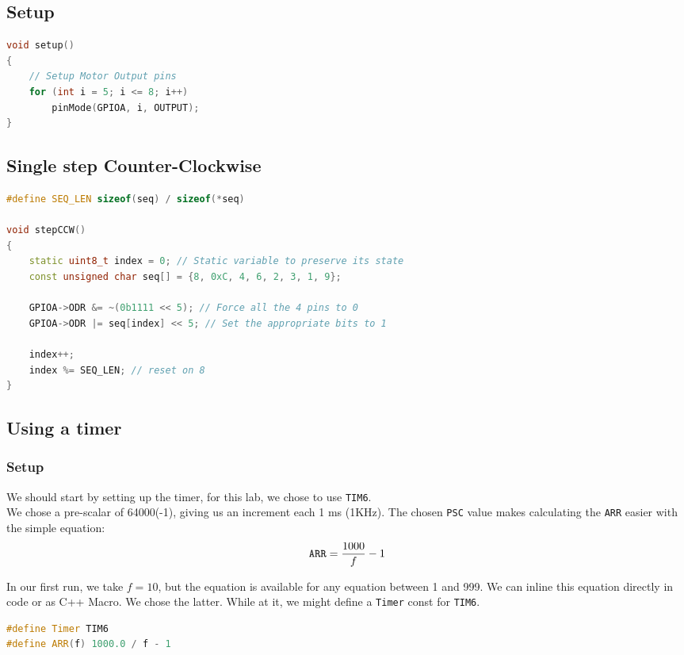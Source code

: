 \documentclass{article}
\begin{document}
\subsection{Setup}

\begin{lstlisting}[language=C++, caption={Motor output setup}]
void setup()
{
    // Setup Motor Output pins
    for (int i = 5; i <= 8; i++)
        pinMode(GPIOA, i, OUTPUT);
}
\end{lstlisting}

\subsection{Single step Counter-Clockwise}
\begin{lstlisting}[language=C++, caption={stepCCW()}]
#define SEQ_LEN sizeof(seq) / sizeof(*seq)

void stepCCW()
{
    static uint8_t index = 0; // Static variable to preserve its state 
    const unsigned char seq[] = {8, 0xC, 4, 6, 2, 3, 1, 9};

    GPIOA->ODR &= ~(0b1111 << 5); // Force all the 4 pins to 0
    GPIOA->ODR |= seq[index] << 5; // Set the appropriate bits to 1

    index++;
    index %= SEQ_LEN; // reset on 8
}
\end{lstlisting}

\subsection{Using a timer}

\subsubsection{Setup}

We should start by setting up the timer, for this lab, we chose to use \verb|TIM6|. \\
We chose a pre-scalar of 64000(-1), giving us an increment each 1 ms (1KHz). The chosen \verb|PSC| value makes calculating the \verb|ARR| easier with the simple equation:
$$
\verb|ARR| = \frac{1000}{f} - 1
$$

In our first run, we take $f = 10$, but the equation is available for any equation between 1 and 999.
We can inline this equation directly in code or as C++ Macro. We chose the latter.
While at it, we might define a \verb|Timer| const for \verb|TIM6|.

\begin{lstlisting}[language=C++]
#define Timer TIM6
#define ARR(f) 1000.0 / f - 1
\end{lstlisting}
\end{document}
